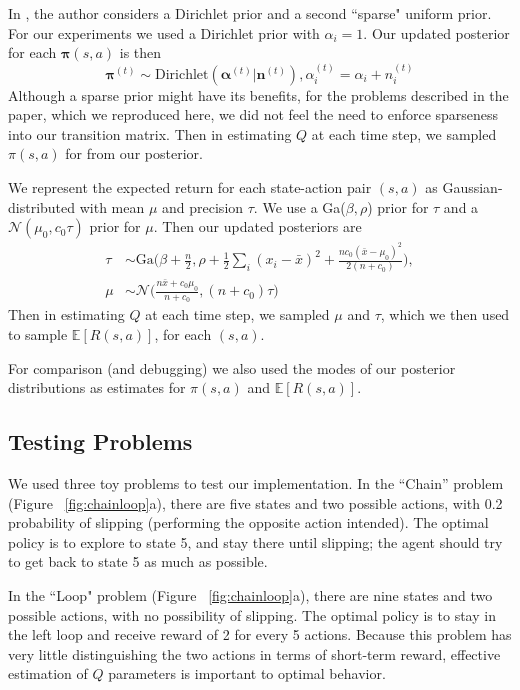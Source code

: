 \documentclass[10pt, twocolumn, twoside]{article}
\begin{document}
In \cite{strens}, the author considers a Dirichlet prior and a second ``sparse"
uniform prior. For our experiments we used a Dirichlet prior with $\alpha_i = 1$.
Our updated posterior for each $\mathbf{\pi}(s, a)$ is then
\begin{equation*}
\mathbf{\pi}^{(t)} \sim \textrm{Dirichlet}(\mathbf{\alpha}^{(t)}| \mathbf{n}^{(t)}),
\alpha^{(t)}_i = \alpha_i + n_i^{(t)}
\end{equation*}
Although a sparse prior might have its benefits, for the problems described in the paper,
which we reproduced here, we did not feel the need to enforce sparseness into our
transition matrix. Then in estimating $Q$ at each time step, we sampled $\pi(s, a)$ for
from our posterior.

We represent the expected return for each state-action pair $(s, a)$ as Gaussian-
distributed with mean $\mu$ and precision $\tau$. We use a Ga($\beta,\rho$)
prior for $\tau$ and a $\mathcal{N}(\mu_0, c_0\tau)$ prior for $\mu$. Then our
updated posteriors are
\begin{align*}
\tau &\sim \textrm{Ga}\Big(\beta + \frac{n}{2}, \rho + \frac{1}{2}\sum_i(x_i - \bar{x})^2
+ \frac{nc_0(\bar{x}-\mu_0)^2}{2(n+c_0)}\Big),\\
\mu &\sim \mathcal{N}\Big(\frac{n\bar{x} + c_0\mu_0}{n + c_0}, (n+c_0)\tau\Big)
\end{align*}
Then in estimating $Q$ at each time step, we sampled $\mu$ and $\tau$, which we then used
to sample $\mathbb{E}[R(s, a)]$, for each $(s, a)$.

For comparison (and debugging) we also used the modes of our posterior distributions as
estimates for $\pi(s, a)$ and $\mathbb{E}[R(s,a)]$.

\subsection{Testing Problems}
We used three toy problems to test our implementation. In the ``Chain'' problem
(Figure ~\ref{fig:chainloop}a), there are five states and two possible actions, with 0.2
probability of slipping (performing the opposite action intended). The optimal
policy is to explore to state 5, and stay there until slipping; the agent should try
to get back to state 5 as much as possible.

In the ``Loop" problem (Figure ~\ref{fig:chainloop}a), there are nine states and
two possible actions, with no possibility of slipping. The optimal policy is to stay
in the left loop and receive reward of 2 for every 5 actions. Because this problem has
very little distinguishing the two actions in terms of short-term reward, effective
estimation of $Q$ parameters is important to optimal behavior.
\end{document}
